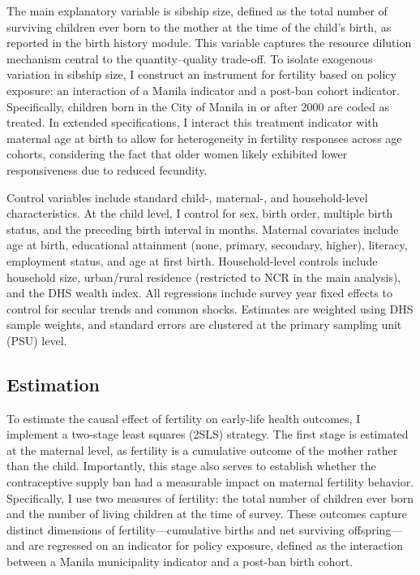 \documentclass[]{AEA}
\begin{document}
The main explanatory variable is sibship size, defined as the total
number of surviving children ever born to the mother at the time of the
child's birth, as reported in the birth history module. This variable
captures the resource dilution mechanism central to the
quantity--quality trade-off. To isolate exogenous variation in sibship
size, I construct an instrument for fertility based on policy exposure:
an interaction of a Manila indicator and a post-ban cohort indicator.
Specifically, children born in the City of Manila in or after 2000 are
coded as treated. In extended specifications, I interact this treatment
indicator with maternal age at birth to allow for heterogeneity in
fertility responses across age cohorts, considering the fact that older
women likely exhibited lower responsiveness due to reduced fecundity.

Control variables include standard child-, maternal-, and
household-level characteristics. At the child level, I control for sex,
birth order, multiple birth status, and the preceding birth interval in
months. Maternal covariates include age at birth, educational attainment
(none, primary, secondary, higher), literacy, employment status, and age
at first birth. Household-level controls include household size,
urban/rural residence (restricted to NCR in the main analysis), and the
DHS wealth index. All regressions include survey year fixed effects to
control for secular trends and common shocks. Estimates are weighted
using DHS sample weights, and standard errors are clustered at the
primary sampling unit (PSU) level.

\subsection{Estimation}

To estimate the causal effect of fertility on early-life health
outcomes, I implement a two-stage least squares (2SLS) strategy. The
first stage is estimated at the maternal level, as fertility is a
cumulative outcome of the mother rather than the child. Importantly,
this stage also serves to establish whether the contraceptive supply ban
had a measurable impact on maternal fertility behavior. Specifically, I
use two measures of fertility: the total number of children ever born
and the number of living children at the time of survey. These outcomes
capture distinct dimensions of fertility---cumulative births and net
surviving offspring---and are regressed on an indicator for policy
exposure, defined as the interaction between a Manila municipality
indicator and a post-ban birth cohort.
\end{document}
